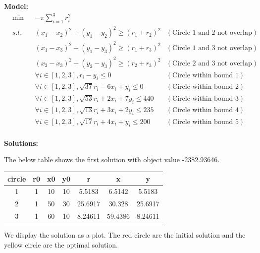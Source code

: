 \textbf{Model:}
\begin{align*}
&\min&& -\pi \sum_{i=1}^3 r_i^2 \\
&s.t.
 && (x_1 - x_2)^2 + (y_1 - y_2)^2 \geq (r_1 + r_2)^2 &(\text{Circle 1 and 2 not overlap})\\
&&& (x_1 - x_3)^2 + (y_1 - y_3)^2 \geq (r_1 + r_3)^2 &(\text{Circle 1 and 3 not overlap})\\
&&& (x_2 - x_3)^2 + (y_2 - y_3)^2 \geq (r_2 + r_3)^2 &(\text{Circle 2 and 3 not overlap}) \\
&&& \forall i \in [1,2,3], r_i - y_i \leq 0 &(\text{Circle within bound 1}) \\
&&& \forall i \in [1,2,3], \sqrt{37}r_i - 6x_i + y_i \leq 0 & (\text{Circle within bound 2}) \\
&&& \forall i \in [1,2,3], \sqrt{53}r_i + 2x_i + 7y_i \leq 440 & (\text{Circle within bound 3}) \\
&&& \forall i \in [1,2,3], \sqrt{13}r_i + 3x_i + 2y_i \leq 235 & (\text{Circle within bound 4}) \\
&&& \forall i \in [1,2,3], \sqrt{17}r_i + 4x_i + y_i \leq 200 & (\text{Circle within bound 5}) \\
\end{align*}
\pagebreak

\textbf{Solutions:}

The below table shows the first solution with object value -2382.93646.
\begin{center}
\begin{tabular}{c || c | c | c || c | c | c}
     circle & r0 & x0 & y0 & r & x & y \\
     \hline
     1     & 1  & 10 & 10 & 5.5183 & 6.5142 & 5.5183 \\
     2     & 1  & 50 & 30 & 25.6917 & 30.328 & 25.6917 \\
     3     & 1  & 60 & 10 & 8.24611 & 59.4386 & 8.24611 \\
\end{tabular}
\end{center}

We display the solution as a plot. The red circle are the initial solution and the yellow circle are the optimal solution.

